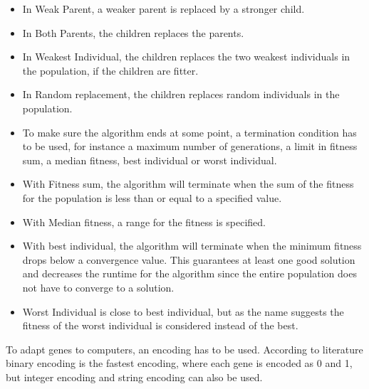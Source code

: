 \begin{itemize}
\item In Weak Parent, a weaker parent is replaced by a stronger child.
\item In Both Parents, the children replaces the parents.
\item In Weakest Individual, the children replaces the two weakest individuals in the population, if the children are fitter.
\item In Random replacement, the children replaces random individuals in the population.
\item To make sure the algorithm ends at some point, a termination condition has to be used, for instance a maximum number of generations, a limit in fitness sum, a median fitness, best individual or worst individual.
\item With Fitness sum, the algorithm will terminate when the sum of the fitness for the population is less than or equal to a specified value.
\item With Median fitness, a range for the fitness is specified.
\item With best individual, the algorithm will terminate when the minimum fitness drops below a convergence value. This guarantees at least one good solution and decreases the runtime for the algorithm since the entire population does not have to converge to a solution.
\item Worst Individual is close to best individual, but as the name suggests the fitness of the worst individual is  considered instead of the best.
\end{itemize}
To adapt genes to computers, an encoding has to be used.  According to literature \cite{GAHandbook1} binary encoding is the fastest encoding, where each gene is encoded as 0 and 1, but integer encoding and string encoding can also be used.\\
